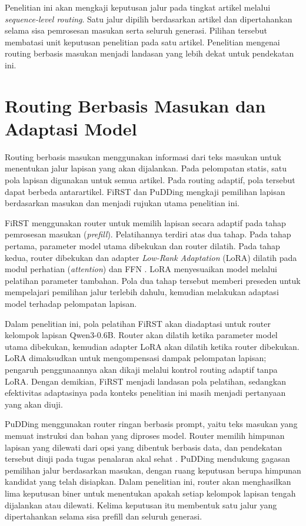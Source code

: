 Penelitian ini akan mengkaji keputusan jalur pada tingkat artikel melalui \textit{sequence-level routing}. Satu jalur dipilih berdasarkan artikel dan dipertahankan selama sisa pemrosesan masukan serta seluruh generasi. Pilihan tersebut membatasi unit keputusan penelitian pada satu artikel. Penelitian mengenai routing berbasis masukan menjadi landasan yang lebih dekat untuk pendekatan ini.

\section{Routing Berbasis Masukan dan Adaptasi Model}

Routing berbasis masukan menggunakan informasi dari teks masukan untuk menentukan jalur lapisan yang akan dijalankan. Pada pelompatan statis, satu pola lapisan digunakan untuk semua artikel. Pada routing adaptif, pola tersebut dapat berbeda antarartikel. FiRST dan PuDDing mengkaji pemilihan lapisan berdasarkan masukan dan menjadi rujukan utama penelitian ini.

FiRST menggunakan router untuk memilih lapisan secara adaptif pada tahap pemrosesan masukan (\textit{prefill}). Pelatihannya terdiri atas dua tahap. Pada tahap pertama, parameter model utama dibekukan dan router dilatih. Pada tahap kedua, router dibekukan dan adapter \textit{Low-Rank Adaptation} (LoRA) dilatih pada modul perhatian (\textit{attention}) dan FFN \citep{jain2025first}. LoRA menyesuaikan model melalui pelatihan parameter tambahan. Pola dua tahap tersebut memberi preseden untuk mempelajari pemilihan jalur terlebih dahulu, kemudian melakukan adaptasi model terhadap pelompatan lapisan.

Dalam penelitian ini, pola pelatihan FiRST akan diadaptasi untuk router kelompok lapisan Qwen3-0.6B. Router akan dilatih ketika parameter model utama dibekukan, kemudian adapter LoRA akan dilatih ketika router dibekukan. LoRA dimaksudkan untuk mengompensasi dampak pelompatan lapisan; pengaruh penggunaannya akan dikaji melalui kontrol routing adaptif tanpa LoRA. Dengan demikian, FiRST menjadi landasan pola pelatihan, sedangkan efektivitas adaptasinya pada konteks penelitian ini masih menjadi pertanyaan yang akan diuji.

PuDDing menggunakan router ringan berbasis prompt, yaitu teks masukan yang memuat instruksi dan bahan yang diproses model. Router memilih himpunan lapisan yang dilewati dari opsi yang dibentuk berbasis data, dan pendekatan tersebut diuji pada tugas penalaran akal sehat \citep{wee2025pudding}. PuDDing mendukung gagasan pemilihan jalur berdasarkan masukan, dengan ruang keputusan berupa himpunan kandidat yang telah disiapkan. Dalam penelitian ini, router akan menghasilkan lima keputusan biner untuk menentukan apakah setiap kelompok lapisan tengah dijalankan atau dilewati. Kelima keputusan itu membentuk satu jalur yang dipertahankan selama sisa prefill dan seluruh generasi.

